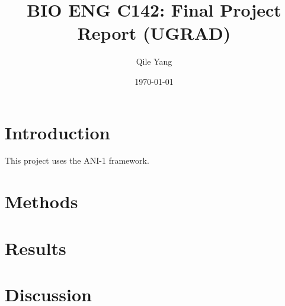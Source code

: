 \documentclass[12pt]{article}
\title{BIO ENG C142: Final Project Report (UGRAD)}
\author{Qile Yang}
\date{\today}
\begin{document}
\maketitle

\begin{abstract}
\end{abstract}

\section{Introduction}
This project uses the ANI-1 framework. \cite{smith2017ani}

\section{Methods}

\section{Results}

\section{Discussion}

\printbibliography[heading=bibnumbered]
\end{document}
